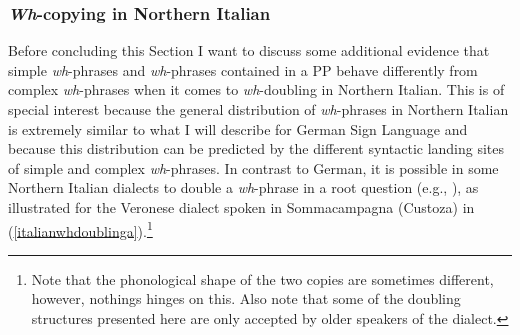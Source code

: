 %
%
%
%
%


\subsubsection{\textit{Wh}-copying in Northern Italian}
Before concluding this Section I want to discuss some additional evidence that simple \textit{wh}-phrases and \textit{wh}-phrases contained in a PP behave differently from complex \textit{wh}-phrases when it comes to \textit{wh}-doubling in Northern Italian. This is of special interest because the general distribution of \textit{wh}-phrases in Northern Italian is extremely similar to what I will describe for German Sign Language and because this distribution can be predicted by the different syntactic landing sites of simple and complex \textit{wh}-phrases. In contrast to German, it is possible in some Northern Italian dialects to double a \textit{wh}-phrase in a root question (e.g., \citealt{poletto2005wh, munaro2005quest}), as illustrated for the Veronese dialect spoken in Sommacampagna (Custoza) in (\ref{italianwhdoublinga}).\footnote{ Note that the phonological shape of the two copies are sometimes different, however, nothings hinges on this. Also note that some of the doubling structures presented here are only accepted by older speakers of the dialect.}

